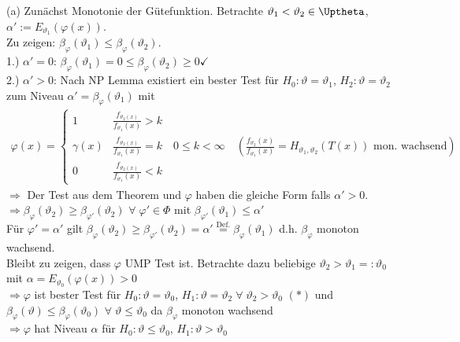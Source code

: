 \documentclass[a4paper,openany]{book}
\theoremstyle{mytheoremstyle}
\theoremstyle{mytheoremstyle2}
\newtheorem*{cbew}{Beweis}
\newenvironment{bew}[1][]{%
  \ifthenelse{\boolean{showbew}}{%
    \begin{cbew}[#1]%
  }{%
    \expandafter\comment%
  }%
}{%
  \ifthenelse{\boolean{showbew}}{%
    \end{cbew}%
  }{%
    \expandafter\endcomment%
  }%
}
\begin{document}
\begin{bew}[]
  (a) Zunächst Monotonie der Gütefunktion. Betrachte $\vartheta _1<\vartheta _2 \in \Uptheta$, $\alpha ':=E _{\vartheta _1}(\varphi (x))$. \\
  Zu zeigen: $\beta _{\varphi }(\vartheta _1)\leq \beta _{\varphi }(\vartheta _2)$. \\
  1.) $\alpha '=0$: $\beta _{\varphi }(\vartheta _1)=0 \leq \beta _{\varphi }(\vartheta _2)\geq 0\checkmark$  \\
  2.) $\alpha '>0$: Nach NP Lemma existiert ein bester Test für $H_0:\vartheta =\vartheta _1$, $H_2:\vartheta =\vartheta _2$ zum Niveau $\alpha '=\beta _{\varphi }(\vartheta _1)$ mit
  \begin{align*}
    \varphi (x)=\begin{cases}
      1 &\frac{f _{\vartheta _2(x)}}{f _{\vartheta _1}(x)}>k\\
      \gamma (x)& \frac{f_{ \vartheta _2(x)}}{f _{\vartheta _1}(x)}=k\quad 0 \leq k< \infty \quad \left(\frac{f _{\vartheta _2}(x)}{f _{\vartheta _1}(x)}=H _{\vartheta _1,\vartheta _2}(T(x))\text{ mon. wachsend}\right)\\
      0 &\frac{f_{ \vartheta _2(x)}}{f _{\vartheta _1}(x)}<k
    \end{cases}
  \end{align*}
  $\Rightarrow $ Der Test aus dem Theorem und $\varphi $ haben die gleiche Form falls $\alpha '>0$. \\
  $\Rightarrow \beta _{\varphi }(\vartheta _2)\geq \beta _{\varphi' }(\vartheta _2)$ $\forall\;\varphi ' \in \Phi$ mit $\beta _{\varphi '}(\vartheta _1)\leq \alpha'$ \\
  Für $\varphi '=\alpha' $ gilt $\beta _{\varphi }(\vartheta _2)\geq \beta _{\varphi '}(\vartheta _2)=\alpha '\overset{\text{Def.}}=\beta _{\varphi }(\vartheta _1)$ d.h. $\beta _{\varphi }$ monoton wachsend. \\
  Bleibt zu zeigen, dass $\varphi $ UMP Test ist. Betrachte dazu beliebige $\vartheta _2>\vartheta _1=:\vartheta _0$ mit $\alpha =E _{\vartheta _0}(\varphi (x))>0$\\
  $\Rightarrow \varphi $ ist bester Test für $H_0:\vartheta = \vartheta _0$, $H_1:\vartheta =\vartheta _2\;\forall\;\vartheta _2>\vartheta _0$ $(*)$ und $\beta _{\varphi }(\vartheta )\leq \beta _{\varphi }(\vartheta _0)$ $\forall\;\vartheta \leq \vartheta _0$ da $\beta _{\varphi }$ monoton wachsend  \\
  $\Rightarrow \varphi $ hat Niveau $\alpha $ für  $H_0:\vartheta \leq \vartheta _0$, $H_1:\vartheta >\vartheta _0$ \\

\end{bew}
\end{document}
